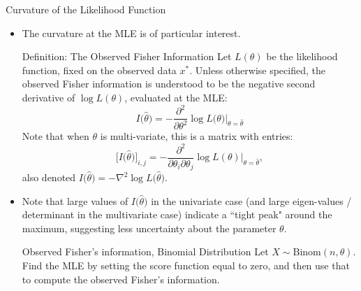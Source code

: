 \begin{frame}[allowframebreaks]{Curvature of the Likelihood Function}
\begin{itemize}
  \framebreak

  \begin{exampleblock}{Comment: joint information}
    We can define the information for just a single point $X_i = x^*_i$,
    $$
    I_i(\theta) = -\frac{\partial^2}{\partial \theta^2} \log f_{X_i}(x^*_i; \theta),
    $$
    or for the entire collection: $X_{1:n} = x^*_{1:n}$:
    $$
    I(\theta) = -\frac{\partial^2}{\partial \theta^2} \sum_i \log f_{X_i}(x^*_i; \theta) = \sum_i I_i(\theta).
    $$
  \end{exampleblock}

  \item The curvature at the MLE is of particular interest.

  \framebreak

  \begin{block}{Definition: The Observed Fisher Information}
    Let $L(\theta)$ be the likelihood function, fixed on the observed data $x^*$. Unless otherwise specified, the \alert{observed Fisher information} is understood to be the negative second derivative of $\log L(\theta)$, evaluated at the MLE:
    $$
    I\big(\hat{\theta}\big) = -\frac{\partial^2}{\partial \theta^2} \log L\big(\theta\big)\Big|_{\theta = \hat{\theta}}
    $$
    Note that when $\theta$ is multi-variate, this is a matrix with entries:
    $$
    \Big[I\big(\hat{\theta}\big)\Big]_{i, j} = -\frac{\partial^2}{\partial \theta_i \partial \theta_j} \log L(\theta)\Big|_{\theta = \hat{\theta}},
    $$
    also denoted $I\big(\hat{\theta}\big) = -\nabla^2 \log L\big(\hat{\theta}\big)$.
  \end{block}

  \framebreak

  \item Note that large values of $I\big(\hat{\theta}\big)$ in the univariate case (and large eigen-values / determinant in the multivariate case) indicate a ``tight peak" around the maximum, suggesting less uncertainty about the parameter $\theta$.

  \begin{exampleblock}{Observed Fisher's information, Binomial Distribution}
  Let $X\sim \text{Binom}(n, \theta)$. Find the MLE by setting the score function equal to zero, and then use that to compute the observed Fisher's information.


\end{exampleblock}
\end{itemize}
\end{frame}
